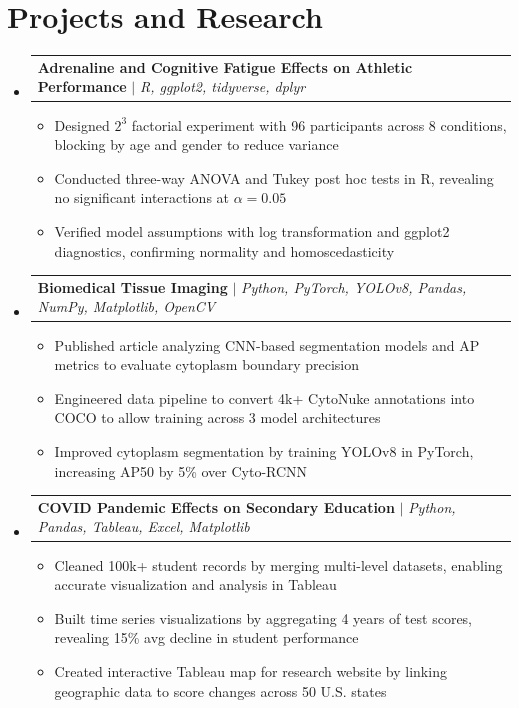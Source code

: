 \documentclass[letterpaper,11pt]{article}
\makeatletter
\newcommand{\resumeItem}[1]{
  \item\small{#1}
}
\newcommand{\resumeProjectHeading}[2]{
    \item
    \begin{tabular*}{\textwidth}{l@{\extracolsep{\fill}}r}
      #1 & #2 \\
    \end{tabular*}\vspace{-7pt}
}
\newcommand{\resumeSubHeadingListStart}{\begin{itemize}[leftmargin=0in, label={}]}
\newcommand{\resumeSubHeadingListEnd}{\end{itemize}}
\newcommand{\resumeItemListStart}{\begin{itemize}[itemsep= 1.5pt, parsep=0pt]}
\newcommand{\resumeItemListEnd}{\end{itemize}\vspace{-5pt}}
\makeatother
\begin{document}
\section{Projects and Research}
    \resumeSubHeadingListStart
      \resumeProjectHeading
          {\textbf{Adrenaline and Cognitive Fatigue Effects on Athletic Performance} $|$ \textit{R, ggplot2, tidyverse, dplyr}}{}
          \resumeItemListStart
            \resumeItem{Designed $2^3$ factorial experiment with 96 participants across 8 conditions, blocking by age and gender to reduce variance}
            \resumeItem{Conducted three-way ANOVA and Tukey post hoc tests in R, revealing no significant interactions at $\alpha = 0.05$}
            \resumeItem{Verified model assumptions with log transformation and ggplot2 diagnostics, confirming normality and homoscedasticity}
          \resumeItemListEnd
      \resumeProjectHeading
          {\textbf{Biomedical Tissue Imaging} $|$ \textit{Python, PyTorch, YOLOv8, Pandas, NumPy, Matplotlib, OpenCV}}{}
          \resumeItemListStart
            \resumeItem{Published article analyzing CNN-based segmentation models and AP metrics to evaluate cytoplasm boundary precision}
            \resumeItem{Engineered data pipeline to convert 4k+ CytoNuke annotations into COCO to allow training across 3 model architectures}
            \resumeItem{Improved cytoplasm segmentation by training YOLOv8 in PyTorch, increasing AP50 by 5\% over Cyto-RCNN}
          \resumeItemListEnd
      \resumeProjectHeading
          {\textbf{COVID Pandemic Effects on Secondary Education} $|$ \textit{Python, Pandas, Tableau, Excel, Matplotlib}}{}
          \resumeItemListStart
            \resumeItem{Cleaned 100k+ student records by merging multi-level datasets, enabling accurate visualization and analysis in Tableau}
            \resumeItem{Built time series visualizations by aggregating 4 years of test scores, revealing 15\% avg decline in student performance}
            \resumeItem{Created interactive Tableau map for research website by linking geographic data to score changes across 50 U.S. states}
          \resumeItemListEnd
    \resumeSubHeadingListEnd
\end{document}
